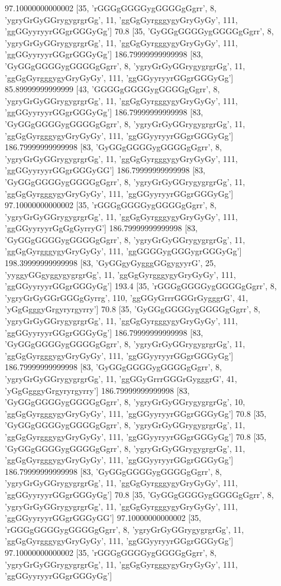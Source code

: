 97.10000000000002 [35, 'rGGGgGGGGygGGGGgGgrr', 8, 'ygryGrGyGGrygygrgrGg', 11, 'ggGgGyrgggygyGryGyGy', 111, 'ggGGyyryyrGGgrGGGyGg']
70.8 [35, 'GyGGgGGGGygGGGGgGgrr', 8, 'ygryGrGyGGrygygrgrGg', 11, 'ggGgGyrgggygyGryGyGy', 111, 'ggGGyyryyrGGgrGGGyGg']
186.79999999999998 [83, 'GyGGgGGGGygGGGGgGgrr', 8, 'ygryGrGyGGrygygrgrGg', 11, 'ggGgGyrgggygyGryGyGy', 111, 'ggGGyyryyrGGgrGGGyGg']
85.89999999999999 [43, 'GGGGgGGGGygGGGGgGgrr', 8, 'ygryGrGyGGrygygrgrGg', 11, 'ggGgGyrgggygyGryGyGy', 111, 'ggGGyyryyrGGgrGGGyGg']
186.79999999999998 [83, 'GyGGgGGGGygGGGGgGgrr', 8, 'ygryGrGyGGrygygrgrGg', 11, 'ggGgGyrgggygyGryGyGy', 111, 'ggGGyyryyrGGgrGGGyGg']
186.79999999999998 [83, 'GyGGgGGGGygGGGGgGgrr', 8, 'ygryGrGyGGrygygrgrGg', 11, 'ggGgGyrgggygyGryGyGy', 111, 'ggGGyyryyrGGgrGGGyGG']
186.79999999999998 [83, 'GyGGgGGGGygGGGGgGgrr', 8, 'ygryGrGyGGrygygrgrGg', 11, 'ggGgGyrgggygyGryGyGy', 111, 'ggGGyyryyrGGgrGGGyGg']
97.10000000000002 [35, 'rGGGgGGGGygGGGGgGgrr', 8, 'ygryGrGyGGrygygrgrGg', 11, 'ggGgGyrgggygyGryGyGy', 111, 'ggGGyyryyrGgGgGyrryG']
186.79999999999998 [83, 'GyGGgGGGGygGGGGgGgrr', 8, 'ygryGrGyGGrygygrgrGg', 11, 'ggGgGyrgggygyGryGyGy', 111, 'ggGGGGygGGGygrGGGyGg']
198.39999999999998 [83, 'GyGGgyGygggGGgygyyrG', 25, 'yyggyGGgyggygygrgrGg', 11, 'ggGgGyrgggygyGryGyGy', 111, 'ggGGyyryyrGGgrGGGyGg']
193.4 [35, 'rGGGgGGGGygGGGGgGgrr', 8, 'ygryGrGyGGrGGGgGyrrg', 110, 'ggGGyGrrrGGGrGygggrG', 41, 'yGgGgggyGrgyryrgyrry']
70.8 [35, 'GyGGgGGGGygGGGGgGgrr', 8, 'ygryGrGyGGrygygrgrGg', 11, 'ggGgGyrgggygyGryGyGy', 111, 'ggGGyyryyrGGgrGGGyGg']
186.79999999999998 [83, 'GyGGgGGGGygGGGGgGgrr', 8, 'ygryGrGyGGrygygrgrGg', 11, 'ggGgGyrgggygyGryGyGy', 111, 'ggGGyyryyrGGgrGGGyGg']
186.79999999999998 [83, 'GyGGgGGGGygGGGGgGgrr', 8, 'ygryGrGyGGrygygrgrGg', 11, 'ggGGyGrrrGGGrGygggrG', 41, 'yGgGgggyGrgyryrgyrry']
186.79999999999998 [83, 'GyGGgGGGGygGGGGgGgrr', 8, 'ygryGrGyGGrygygrgrGg', 10, 'ggGgGyrgggygyGryGyGy', 111, 'ggGGyyryyrGGgrGGGyGg']
70.8 [35, 'GyGGgGGGGygGGGGgGgrr', 8, 'ygryGrGyGGrygygrgrGg', 11, 'ggGgGyrgggygyGryGyGy', 111, 'ggGGyyryyrGGgrGGGyGg']
70.8 [35, 'GyGGgGGGGygGGGGgGgrr', 8, 'ygryGrGyGGrygygrgrGg', 11, 'ggGgGyrgggygyGryGyGy', 111, 'ggGGyyryyrGGgrGGGyGg']
186.79999999999998 [83, 'GyGGgGGGGygGGGGgGgrr', 8, 'ygryGrGyGGrygygrgrGg', 11, 'ggGgGyrgggygyGryGyGy', 111, 'ggGGyyryyrGGgrGGGyGg']
70.8 [35, 'GyGGgGGGGygGGGGgGgrr', 8, 'ygryGrGyGGrygygrgrGg', 11, 'ggGgGyrgggygyGryGyGy', 111, 'ggGGyyryyrGGgrGGGyGG']
97.10000000000002 [35, 'rGGGgGGGGygGGGGgGgrr', 8, 'ygryGrGyGGrygygrgrGg', 11, 'ggGgGyrgggygyGryGyGy', 111, 'ggGGyyryyrGGgrGGGyGg']
97.10000000000002 [35, 'rGGGgGGGGygGGGGgGgrr', 8, 'ygryGrGyGGrygygrgrGg', 11, 'ggGgGyrgggygyGryGyGy', 111, 'ggGGyyryyrGGgrGGGyGg']
